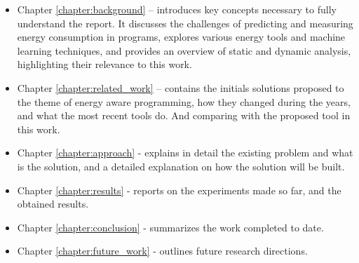 \begin{itemize}
\item Chapter \ref{chapter:background} – introduces key concepts necessary to fully understand the report. It discusses the challenges of predicting and measuring energy consumption in programs, explores various energy tools and machine learning techniques, and provides an overview of static and dynamic analysis, highlighting their relevance to this work.

\item Chapter \ref{chapter:related_work} – contains the initials solutions proposed to the theme of energy aware programming, how they changed during the years, and what the most recent tools do. And comparing with the proposed tool in this work.

\item Chapter \ref{chapter:approach} - explains in detail the existing problem and what is the solution, and a detailed explanation on how the solution will be built.

\item Chapter \ref{chapter:results} - reports on the experiments made so far, and the obtained results.

\item Chapter \ref{chapter:conclusion} - summarizes the work completed to date.

\item Chapter \ref{chapter:future_work} - outlines future research directions.

\end{itemize}